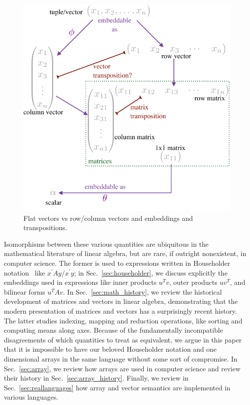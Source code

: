 \begin{figure}
\caption{Flat vectors vs row/column vectors and embeddings and transpositions.}

\centering{}\includegraphics[width=0.9\columnwidth]{figures/fig-embed}
\end{figure}

Isomorphisms between these various quantities are ubiquitous in the mathematical literature of linear algebra, but are rare, if outright nonexistent, in computer science. The former is used to expressions written in Householder notation~\cite{Householder1953,Householder1955} like $x^\prime Ay/x^\prime y$; in Sec.~\ref{sec:householder}, we discuss explicitly the embeddings used in expressions like inner products $u^T v$, outer products $u v^T$, and bilinear forms $u^T A v$. In Sec.~\ref{sec:math_history}, we review the historical development of matrices and vectors in linear algebra, demonstrating that the modern presentation of matrices and vectors has a surprisingly recent history. The latter studies indexing, mapping and reduction operations, like sorting and computing means along axes. Because of the fundamentally incompatible disagreements of which quantities to treat as equivalent, we argue in this paper that it is impossible to have our beloved Householder notation and one dimensional arrays in the same language without some sort of compromise. In Sec.~\ref{sec:array}, we review how arrays are used in computer science and review their history in Sec.~\ref{sec:array_history}. Finally, we review in Sec.~\ref{sec:reallanguages} how array and vector semantics are implemented in various languages.
